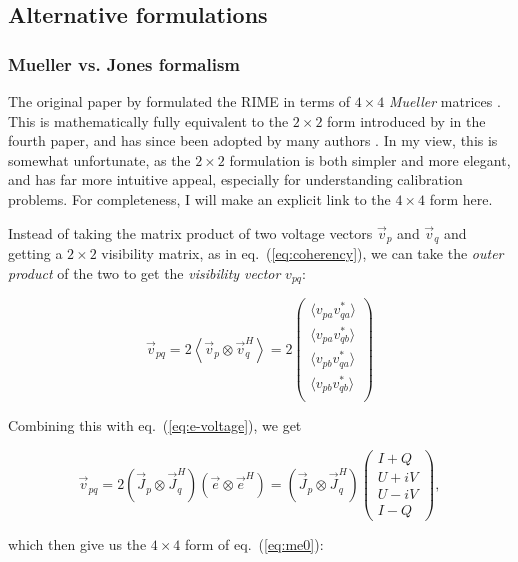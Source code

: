\documentclass[]{aa}
\newcommand{\herm}{H}
\newcommand{\jones}[2]{\vec {#1}_{#2}}
\newcommand{\jonesT}[2]{\vec {#1}^{\herm}_{#2}}
\begin{document}
\subsection{\label{sec:formulations}Alternative formulations}

\subsubsection{Mueller vs. Jones formalism\label{sec:mueller}}

The original paper by \citet{ME1} formulated the RIME in terms of $4\times4$ {\em Mueller} matrices \citep{Muller}. This is mathematically fully equivalent to the $2\times2$ form introduced by \citet{ME4} in the fourth paper, and has since been adopted by many authors \citep{JEN:note185,tms,SB:imageplane,Rau:DDEs}. In my view, this is somewhat unfortunate, as the $2\times2$ formulation is both simpler and more elegant, and has far more intuitive appeal, especially for understanding calibration problems. For completeness, I will make an explicit link to the $4\times4$ form here.

Instead of taking the matrix product of two voltage vectors $\vec v_p$ and $\vec v_q$ and getting a $2\times2$ visibility matrix, as in eq.~(\ref{eq:coherency}), we can take the {\em outer product} of the two to get the {\em visibility vector} $v_{pq}$:

\[
\vec v_{pq} = 2 \left< \vec v_p \otimes \vec v^\herm_q \right > = 2 \left ( 
\begin{array}{c}
    \langle v_{pa}v^*_{qa}\rangle \\ \langle v_{pa}v^*_{qb}\rangle \\
    \langle v_{pb}v^*_{qa}\rangle \\ \langle v_{pb}v^*_{qb}\rangle \\
\end{array} 
\right ) 
\]

Combining this with eq.~(\ref{eq:e-voltage}), we get

\[
    \vec v_{pq} = 2 ( \jones{J}{p} \otimes \jonesT{J}{q} ) (\vec e \otimes \vec e^\herm )
 = ( \jones{J}{p} \otimes \jonesT{J}{q} ) 
\left ( \begin{array}{c}
I+Q \\ U+iV \\ U-iV \\ I-Q
\end{array} \right ), 
\]

which then give us the $4\times4$ form of eq.~(\ref{eq:me0}):
\end{document}
